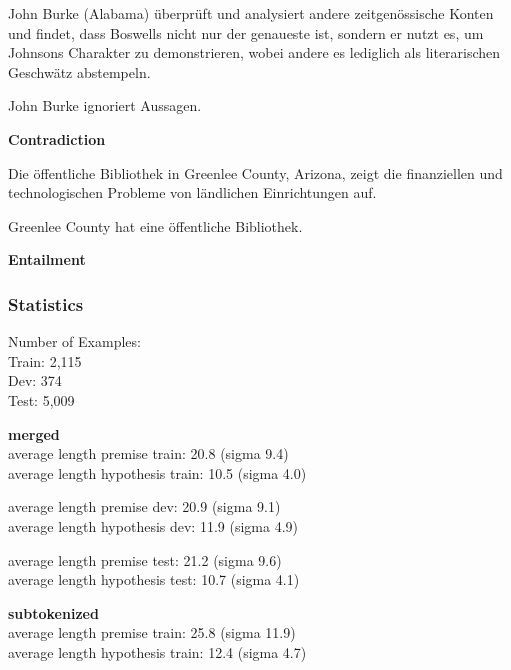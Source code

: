 \begin{examples}
\item John Burke (Alabama) überprüft und analysiert andere zeitgenössische Konten und findet, dass Boswells nicht nur der genaueste ist, sondern er nutzt es, um Johnsons Charakter zu demonstrieren, wobei andere es lediglich als literarischen Geschwätz abstempeln.

        John Burke ignoriert Aussagen.

				\textbf{Contradiction}
\end{examples}

\begin{examples}
	\item Die öffentliche Bibliothek in Greenlee County, Arizona, zeigt die finanziellen und technologischen Probleme von ländlichen Einrichtungen auf.

        Greenlee County hat eine öffentliche Bibliothek.

				\textbf{Entailment}
\end{examples}



\subsubsection{Statistics}

Number of Examples: \\
Train: 2,115 \\
Dev: 374 \\
Test: 5,009

\textbf{merged} \\
average length premise train: 20.8 (sigma 9.4) \\
average length hypothesis train: 10.5 (sigma 4.0)

average length premise dev: 20.9 (sigma 9.1) \\
average length hypothesis dev: 11.9 (sigma 4.9)

average length premise test: 21.2 (sigma 9.6) \\
average length hypothesis test: 10.7 (sigma 4.1)


\textbf{subtokenized} \\
average length premise train: 25.8 (sigma 11.9) \\
average length hypothesis train: 12.4 (sigma 4.7)

